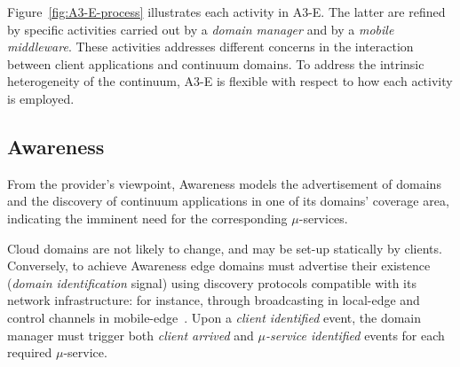 Figure~\ref{fig:A3-E-process} illustrates each activity in A3-E. The latter are refined by specific activities carried out by a \textit{domain manager} and by a \textit{mobile middleware}. These activities addresses different concerns in the interaction between client applications and continuum domains. 
To address the intrinsic heterogeneity of the continuum, A3-E is flexible with respect to how each activity is employed.






\subsection{Awareness}\label{sec:A3-E-awareness}

From the provider's viewpoint, Awareness models the advertisement of domains and the discovery of continuum applications in one of its domains' coverage area, indicating the imminent need for the corresponding $\mu$-services. 


Cloud domains are not likely to change, 
and may be set-up statically by clients.
Conversely, to achieve Awareness edge domains must advertise their existence (\textit{domain identification} signal) using discovery protocols compatible with its network infrastructure: for instance, through broadcasting in local-edge and control channels in mobile-edge~\cite{ETSI:MEC:ARCHITECTURE}. 
Upon a \textit{client identified} event, the domain manager must trigger both \textit{client arrived} and \textit{$\mu$-service identified} events for each required $\mu$-service.

